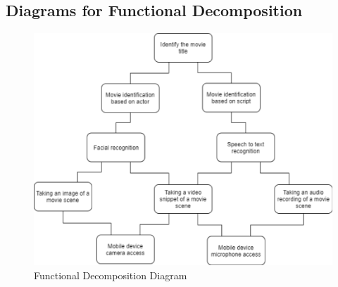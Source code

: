 \documentclass[titlepage]{article}
\begin{document}
\subsection{Diagrams for Functional Decomposition}
\begin{figure}[H]
    \centering
    \includegraphics[width = 15cm]{img/SystemRequirement/fd.png}
    \caption{Functional Decomposition Diagram}
    \label{fig:Functional_Decomposition}
\end{figure}
\end{document}
